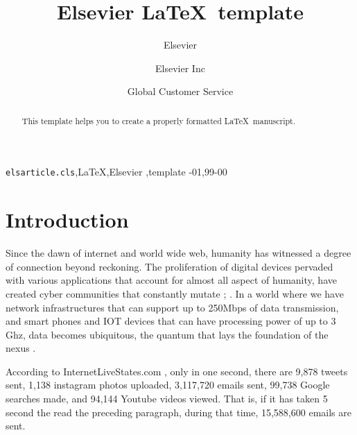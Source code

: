 \documentclass[review]{elsarticle}
\begin{document}
\begin{frontmatter}

\title{Elsevier \LaTeX\ template}

\author{Elsevier}
\address{Radarweg 29, Amsterdam}

\author[mymainaddress,mysecondaryaddress]{Elsevier Inc}

\author[mysecondaryaddress]{Global Customer Service}

\address[mymainaddress]{1600 John F Kennedy Boulevard, Philadelphia}
\address[mysecondaryaddress]{360 Park Avenue South, New York}

\begin{abstract}
This template helps you to create a properly formatted \LaTeX\ manuscript.
\end{abstract}

\begin{keyword}
\texttt{elsarticle.cls}\sep \LaTeX\sep Elsevier \sep template
-01\sep  99-00
\end{keyword}

\end{frontmatter}

\linenumbers

\section{Introduction}

Since the dawn of internet and world wide web, humanity has witnessed a degree of connection beyond reckoning. The proliferation of digital devices pervaded with various applications that account for almost all aspect of humanity, have created cyber communities that constantly mutate \cite{AtaeiACIS}; \cite{AtaeiBigDataEnvirons}. In a world where we have network infrastructures that can support up to 250Mbps of data transmission, and smart phones and IOT devices that can have processing power of up to 3 Ghz, data becomes ubiquitous, the quantum that lays the foundation of the nexus \cite{AtaeiApsec}. 

According to InternetLiveStates.com \cite{internet2019internet}, only in one second, there are 9,878 tweets sent, 1,138 instagram photos uploaded, 3,117,720 emails sent, 99,738 Google searches made, and 94,144 Youtube videos viewed. That is, if it has taken 5 second the read the preceding paragraph, during that time, 15,588,600 emails are sent. 
\end{document}
